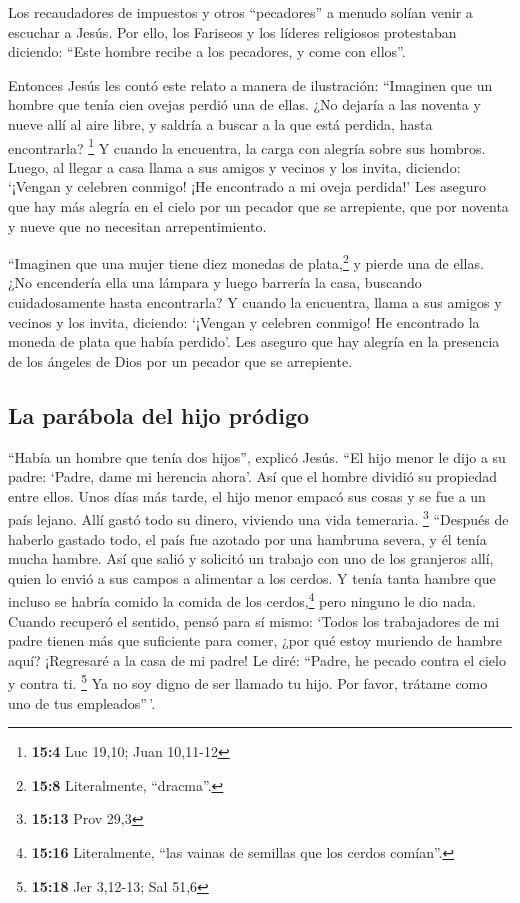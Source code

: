  Los recaudadores de impuestos y otros ``pecadores'' a
menudo solían venir a escuchar a Jesús.  Por ello, los
Fariseos y los líderes religiosos protestaban diciendo: ``Este hombre
recibe a los pecadores, y come con ellos''.

 Entonces Jesús les contó este relato a manera de
ilustración:  ``Imaginen que un hombre que tenía cien
ovejas perdió una de ellas. ¿No dejaría a las noventa y nueve allí al
aire libre, y saldría a buscar a la que está perdida, hasta encontrarla?
\footnote{\textbf{15:4} Luc 19,10; Juan 10,11-12}  Y
cuando la encuentra, la carga con alegría sobre sus hombros.
 Luego, al llegar a casa llama a sus amigos y vecinos y
los invita, diciendo: `¡Vengan y celebren conmigo! ¡He encontrado a mi
oveja perdida!'  Les aseguro que hay más alegría en el
cielo por un pecador que se arrepiente, que por noventa y nueve que no
necesitan arrepentimiento.

 ``Imaginen que una mujer tiene diez monedas de
plata,\footnote{\textbf{15:8} Literalmente, ``dracma''.} y pierde una de
ellas. ¿No encendería ella una lámpara y luego barrería la casa,
buscando cuidadosamente hasta encontrarla?  Y cuando la
encuentra, llama a sus amigos y vecinos y los invita, diciendo: `¡Vengan
y celebren conmigo! He encontrado la moneda de plata que había perdido'.
 Les aseguro que hay alegría en la presencia de los
ángeles de Dios por un pecador que se arrepiente.

\hypertarget{la-paruxe1bola-del-hijo-pruxf3digo}{%
\subsection{La parábola del hijo
pródigo}\label{la-paruxe1bola-del-hijo-pruxf3digo}}

 ``Había un hombre que tenía dos hijos'', explicó Jesús.
 ``El hijo menor le dijo a su padre: `Padre, dame mi
herencia ahora'. Así que el hombre dividió su propiedad entre ellos.
 Unos días más tarde, el hijo menor empacó sus cosas y se
fue a un país lejano. Allí gastó todo su dinero, viviendo una vida
temeraria. \footnote{\textbf{15:13} Prov 29,3}  ``Después
de haberlo gastado todo, el país fue azotado por una hambruna severa, y
él tenía mucha hambre.  Así que salió y solicitó un
trabajo con uno de los granjeros allí, quien lo envió a sus campos a
alimentar a los cerdos.  Y tenía tanta hambre que incluso
se habría comido la comida de los cerdos,\footnote{\textbf{15:16}
  Literalmente, ``las vainas de semillas que los cerdos comían''.} pero
ninguno le dio nada.  Cuando recuperó el sentido, pensó
para sí mismo: `Todos los trabajadores de mi padre tienen más que
suficiente para comer, ¿por qué estoy muriendo de hambre aquí?
 ¡Regresaré a la casa de mi padre! Le diré: ``Padre, he
pecado contra el cielo y contra ti. \footnote{\textbf{15:18} Jer
  3,12-13; Sal 51,6}  Ya no soy digno de ser llamado tu
hijo. Por favor, trátame como uno de tus empleados''\,'.


